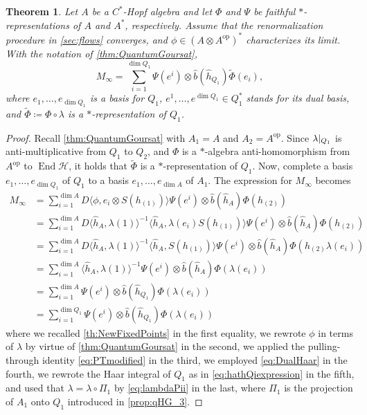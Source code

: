 \documentclass[a4paper,10pt]{amsart}
\newcommand{\eval}[2]{\langle #1 , #2\rangle}
\newtheorem{theorem}{Theorem}[section]
\theoremstyle{definition}
\begin{document}
\begin{theorem} \label{th:newGoursatFP}
Let $A$ be a $C^*$-Hopf algebra and let $\Phi$ and $\Psi$ be faithful $*$-representations of $A$ and $A^*$, respectively.
Assume that the renormalization procedure in \cref{sec:flows} converges, and $\phi\in (A\otimes A^{\mathrm{op}})^*$ characterizes its limit.
With the notation of \cref{thm:QuantumGoursat},
\begin{equation*}
    M_{\infty} =
             \sum_{i=1}^{\dim Q_1}   \Psi(e^i) \otimes \hat{b}(\hat{h}_{Q_1}) \tilde{\Phi}(e_i),
\end{equation*}
where $e_1,\ldots,e_{\dim Q_1}$ is a basis for $Q_1$, $e^{1},\ldots,e^{\dim Q_1}\in Q_1^*$ stands for its dual basis, and $\tilde{\Phi} \coloneqq \Phi \circ \lambda$ is a $*$-representation of $Q_1$.
\end{theorem}

\begin{proof}
Recall \cref{thm:QuantumGoursat} with $A_1 = A$ and $A_2 = A^{\mathrm{op}}$. Since 
$\lambda|_{\smash{Q_1}}$ is anti-multiplicative from
$Q_1$ to $Q_2$, and  $\Phi$ is a $*$-algebra anti-homomorphism from $A^{\mathrm{op}}$ to $\operatorname{End}\mathscr{H}$, it holds that $\tilde\Phi$ is a $*$-representation of $Q_1$.
Now, complete a basis $e_{1},\ldots,e_{\dim Q_1}$ of $Q_1$ to a basis $e_1,\ldots,e_{\dim A}$ of $A_1$.
The expression for $M_\infty$ becomes
\begin{align*}
    M_\infty
    &=
    \sum_{i=1}^{\dim A}
        D \eval{\phi}{e_i \otimes S(h_{(1)})} 
        \Psi(e^i)
        \otimes
        \hat{b}(\hat{h}_A) \Phi(h_{(2)})
    \\
    &=
    \sum_{i=1}^{\dim A}
        D \eval{\hat{h}_A}{\lambda(1)}^{-1}
        \eval{\hat{h}_A}{\lambda(e_i)S(h_{(1)})} 
        \Psi(e^i)
        \otimes
        \hat{b}(\hat{h}_A) \Phi(h_{(2)})
    \\
    &=
    \sum_{i=1}^{\dim A}
        D \eval{\hat{h}_A}{\lambda(1)}^{-1}
        \eval{\hat{h}_A}{S(h_{(1)})} 
        \Psi(e^i)
        \otimes
        \hat{b}(\hat{h}_A) \Phi(h_{(2)}\lambda(e_i))
    \\
    &=
    \sum_{i=1}^{\dim A}
        \eval{\hat{h}_A}{\lambda(1)}^{-1}
        \Psi(e^i)
        \otimes
        \hat{b}(\hat{h}_A) \Phi(\lambda(e_i))
    \\
    &=
    \sum_{i=1}^{\dim A}
        \Psi(e^i)
        \otimes
        \hat{b}(\hat{h}_{Q_1}) \Phi(\lambda(e_i))
    \\
    &=
    \sum_{i=1}^{\dim Q_1}
        \Psi(e^i)
        \otimes
        \hat{b}(\hat{h}_{Q_1}) \Phi(\lambda(e_i))
\end{align*}
where we recalled \cref{th:NewFixedPoints} in the first equality, we rewrote $\phi$ in terms of $\lambda$ by virtue of \cref{thm:QuantumGoursat} in the second, we applied the pulling-through identity \cref{eq:PTmodified} in the third, we employed \cref{eq:DualHaar} in the fourth, we rewrote the Haar integral of $Q_1$ as in \cref{eq:hathQiexpression} in the fifth, and used that $\lambda = \lambda \circ \Pi_1$ by \cref{eq:lambdaPii} in the last, where $\Pi_1$ is the projection of $A_1$ onto $Q_1$ introduced in \cref{prop:qHG_3}.
\end{proof}
\end{document}
